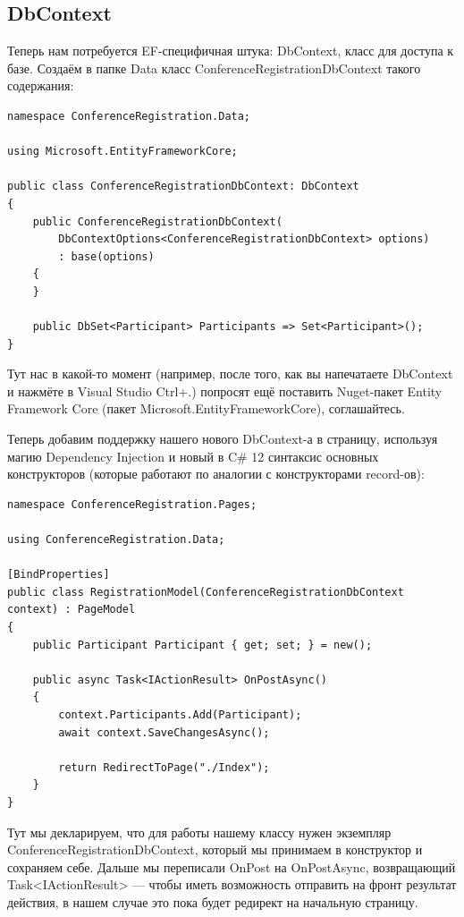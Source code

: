 \documentclass{../../text-style}
\begin{document}
\subsection{DbContext}

Теперь нам потребуется EF-специфичная штука: DbContext, класс для доступа к базе. Создаём в папке Data класс ConferenceRegistrationDbContext такого содержания:

\begin{verbatim}
namespace ConferenceRegistration.Data;

using Microsoft.EntityFrameworkCore;

public class ConferenceRegistrationDbContext: DbContext
{
    public ConferenceRegistrationDbContext(
        DbContextOptions<ConferenceRegistrationDbContext> options)
        : base(options)
    {
    }

    public DbSet<Participant> Participants => Set<Participant>();
}
\end{verbatim}

Тут нас в какой-то момент (например, после того, как вы напечатаете DbContext и нажмёте в Visual Studio Ctrl+.) попросят ещё поставить Nuget-пакет Entity Framework Core (пакет Microsoft.EntityFrameworkCore), соглашайтесь.

Теперь добавим поддержку нашего нового DbContext-а в страницу, используя магию Dependency Injection и новый в C\# 12 синтаксис основных конструкторов (которые работают по аналогии с конструкторами record-ов):

\begin{verbatim}
namespace ConferenceRegistration.Pages;

using ConferenceRegistration.Data;

[BindProperties]
public class RegistrationModel(ConferenceRegistrationDbContext context) : PageModel
{
    public Participant Participant { get; set; } = new();

    public async Task<IActionResult> OnPostAsync()
    {
        context.Participants.Add(Participant);
        await context.SaveChangesAsync();

        return RedirectToPage("./Index");
    }
}
\end{verbatim}

Тут мы декларируем, что для работы нашему классу нужен экземпляр ConferenceRegistrationDbContext, который мы принимаем в конструктор и сохраняем себе. Дальше мы переписали OnPost на OnPostAsync, возвращающий Task<IActionResult> --- чтобы иметь возможность отправить на фронт результат действия, в нашем случае это пока будет редирект на начальную страницу.
\end{document}
